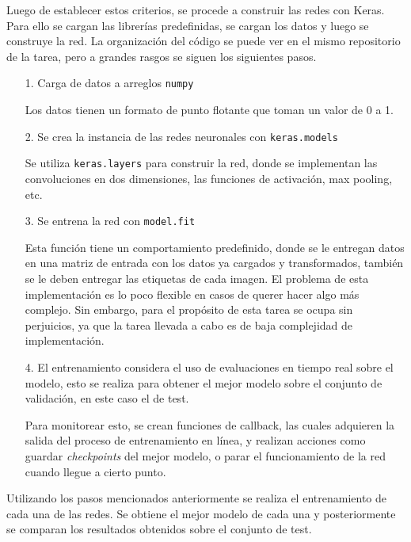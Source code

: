         Luego de establecer estos criterios, se procede a construir las redes con Keras. Para ello se cargan las librerías predefinidas, se cargan los datos y luego se construye la red. La organización del código se puede ver en el mismo repositorio de la tarea, pero a grandes rasgos se siguen los siguientes pasos.
        
        \begin{enumerate}
            \item[1.] Carga de datos a arreglos \texttt{numpy}
                
            Los datos tienen un formato de punto flotante que toman un valor de 0 a 1.
            
            \item[2.] Se crea la instancia de las redes neuronales con \texttt{keras.models}
            
            Se utiliza \texttt{keras.layers} para construir la red, donde se implementan las convoluciones en dos dimensiones, las funciones de activación, max pooling, etc.
            
            \item[3.] Se entrena la red con \texttt{model.fit}
            
            Esta función tiene un comportamiento predefinido, donde se le entregan datos en una matriz de entrada con los datos ya cargados y transformados, también se le deben entregar las etiquetas de cada imagen. El problema de esta implementación es lo poco flexible en casos de querer hacer algo más complejo. Sin embargo, para el propósito de esta tarea se ocupa sin perjuicios, ya que la tarea llevada a cabo es de baja complejidad de implementación.
            
            \item[4.] El entrenamiento considera el uso de evaluaciones en tiempo real sobre el modelo, esto se realiza para obtener el mejor modelo sobre el conjunto de validación, en este caso el de test.
            
            Para monitorear esto, se crean funciones de callback, las cuales adquieren la salida del proceso de entrenamiento en línea, y realizan acciones como guardar \textit{checkpoints} del mejor modelo, o parar el funcionamiento de la red cuando llegue a cierto punto.
        \end{enumerate}
        
        Utilizando los pasos mencionados anteriormente se realiza el entrenamiento de cada una de las redes. Se obtiene el mejor modelo de cada una y posteriormente se comparan los resultados obtenidos sobre el conjunto de test.
        
